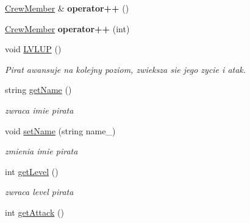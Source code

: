 \begin{DoxyCompactItemize}
\mbox{\label{class_crew_member_a6421e136cb395d24d3b7bcff7445decf}} 
\hyperlink{class_crew_member}{Crew\+Member} \& {\bfseries operator++} ()
\item 
\mbox{\label{class_crew_member_a28fa041c3e2e9407dcfefb0a3c072c66}} 
\hyperlink{class_crew_member}{Crew\+Member} {\bfseries operator++} (int)
\item 
\mbox{\label{class_crew_member_a704d4e951b7b794e1f2acc4072fd4234}} 
void \hyperlink{class_crew_member_a704d4e951b7b794e1f2acc4072fd4234}{L\+V\+L\+UP} ()
\begin{DoxyCompactList}\small\item\em Pirat awansuje na kolejny poziom, zwieksza sie jego zycie i atak. \end{DoxyCompactList}\item 
\mbox{\label{class_crew_member_a730e140e62942ff6e0ecaf13a5659479}} 
string \hyperlink{class_crew_member_a730e140e62942ff6e0ecaf13a5659479}{get\+Name} ()
\begin{DoxyCompactList}\small\item\em zwraca imie pirata \end{DoxyCompactList}\item 
\mbox{\label{class_crew_member_ac2558ae043b9252881a2cbff11b9d27a}} 
void \hyperlink{class_crew_member_ac2558ae043b9252881a2cbff11b9d27a}{set\+Name} (string name\+\_\+)
\begin{DoxyCompactList}\small\item\em zmienia imie pirata \end{DoxyCompactList}\item 
\mbox{\label{class_crew_member_ad2690b5ea050ff33c969b4b8c18d88b3}} 
int \hyperlink{class_crew_member_ad2690b5ea050ff33c969b4b8c18d88b3}{get\+Level} ()
\begin{DoxyCompactList}\small\item\em zwraca level pirata \end{DoxyCompactList}\item 
\mbox{\label{class_crew_member_aa3af9da6005c0cde36e91ebac14ff833}} 
int \hyperlink{class_crew_member_aa3af9da6005c0cde36e91ebac14ff833}{get\+Attack} ()

\end{DoxyCompactItemize}
